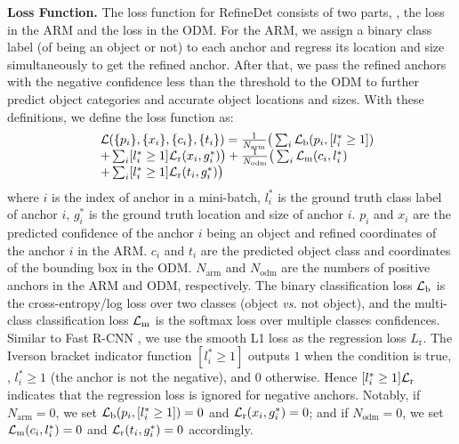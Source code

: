 \documentclass[10pt,twocolumn,letterpaper]{article}
\begin{document}
{\noindent \textbf{Loss Function.}}
The loss function for RefineDet consists of two parts, \ie, the loss in the ARM and the loss in the ODM. For the ARM, we assign a binary class label (of being an object or not) to each anchor and regress its location and size simultaneously to get the refined anchor. After that, we pass the refined anchors with the negative confidence less than the threshold to the ODM to further predict object categories and accurate object locations and sizes. With these definitions, we define the loss function as:
\begin{equation}
\begin{array}{cl}
&{\cal L}(\{p_i\},\{x_i\},\{c_i\},\{t_i\})=\frac{1}{N_{\text{arm}}} \big( \sum_{i}{\cal L}_{\text{b}}(p_i,[l_i^\ast\geq1])  \\
&+\sum_{i}[l_i^\ast\geq1]{\cal L}_{\text{r}}(x_i, g_i^\ast)\big) + \frac{1}{N_{\text{odm}}} \big( \sum_{i}{\cal L}_{\text{m}}(c_i, l_i^\ast)  \\
&+\sum_{i}[l_i^\ast\geq1]{\cal L}_{\text{r}}(t_i, g_i^\ast)\big)
\end{array}
\label{1}
\end{equation}
where $i$ is the index of anchor in a mini-batch, $l_i^\ast$ is the ground truth class label of anchor $i$, $g_i^\ast$ is the ground truth location and size of anchor $i$. $p_i$ and $x_i$ are the predicted confidence of the anchor $i$ being an object and refined coordinates of the anchor $i$ in the ARM. $c_i$ and $t_i$ are the predicted object class and coordinates of the bounding box in the ODM. $N_{\text{arm}}$ and $N_{\text{odm}}$ are the numbers of positive anchors in the ARM and ODM, respectively. The binary classification loss ${\cal L}_{\text{b}}$ is the cross-entropy/log loss over two classes (object {\em vs.} not object), and the multi-class classification loss ${\cal L}_{\text{m}}$ is the softmax loss over multiple classes confidences. Similar to Fast R-CNN \cite{DBLP:conf/iccv/Girshick15}, we use the smooth L1 loss as the regression loss $L_{\text{r}}$. The Iverson bracket indicator function $[l_i^\ast\geq1]$ outputs $1$ when the condition is true, \ie, $l_i^\ast\geq1$ (the anchor is not the negative), and $0$ otherwise. Hence $[l_i^\ast\geq1]{\cal L}_{\text{r}}$ indicates that the regression loss is ignored for negative anchors. Notably, if $N_{\text{arm}}=0$, we set ${\cal L}_{\text{b}}(p_i,[l_i^\ast\geq1])=0$ and ${\cal L}_{\text{r}}(x_i, g_i^\ast)=0$; and if $N_{\text{odm}}=0$, we set ${\cal L}_{\text{m}}(c_i, l_i^\ast)=0$ and ${\cal L}_{\text{r}}(t_i, g_i^\ast)=0$ accordingly.
\end{document}
